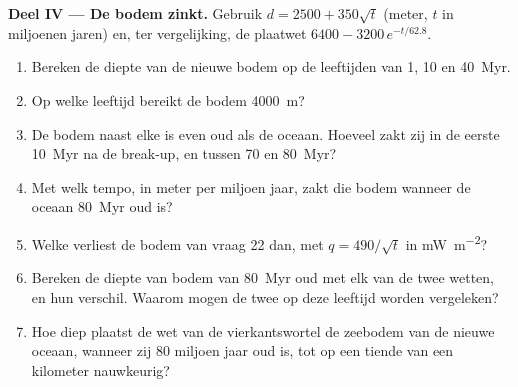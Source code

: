 \begin{problem}
\medskip
\noindent\textbf{Deel IV --- De bodem zinkt.} Gebruik $d = 2500 + 350\sqrt t$ (meter, $t$ in miljoenen jaren) en, ter vergelijking, de plaatwet $6400 - 3200\,e^{-t/62.8}$.
\begin{enumerate}[resume]
  \item Bereken de diepte van de nieuwe bodem op de leeftijden van 1, 10 en \qty{40}{Myr}.
  \item Op welke leeftijd bereikt de bodem \qty{4000}{m}?
  \item De bodem naast elke  is even oud als de oceaan. Hoeveel zakt zij in de eerste \qty{10}{Myr} na de break-up, en tussen 70 en \qty{80}{Myr}?
  \item Met welk tempo, in meter per miljoen jaar, zakt die bodem wanneer de oceaan \qty{80}{Myr} oud is?
  \item Welke  verliest de bodem van vraag 22 dan, met $q = 490/\sqrt t$ in \unit{mW.m^{-2}}?
  \item Bereken de diepte van bodem van \qty{80}{Myr} oud met elk van de twee wetten, en hun verschil. Waarom mogen de twee op deze leeftijd worden vergeleken?
  \item Hoe diep plaatst de wet van de vierkantswortel de zeebodem van de nieuwe oceaan, wanneer zij 80 miljoen jaar oud is, tot op een tiende van een kilometer nauwkeurig?
\end{enumerate}
\end{problem}
